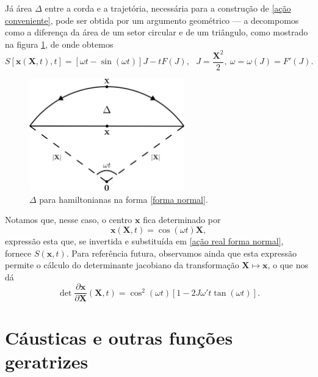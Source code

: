 \documentclass[
	12pt,
	oneside,			%
	a4paper,			%
	english,			%
	brazil				%
	]{abntex2}
\theoremstyle{definition}
\begin{document}
Já área $\Delta$ entre a corda e a trajetória, necessária para a construção de \eqref{ação conveniente}, pode ser obtida por um argumento geométrico — a decompomos como a diferença da área de um setor circular e de um triângulo, como mostrado na figura \ref{area birkhoff}, de onde obtemos
\begin{equation}
\label{ação real forma normal}
    S\left[ \mathbf{x}\left( \mathbf{X},t\right),t \right] = \left[ \omega t - \sin \left(\omega t\right) \right] J - t F\left( J \right), \ \ \ J = \frac{\mathbf{X}^2}{2}, \ \omega = \omega(J) = F'(J).
\end{equation}

\begin{figure}[H]
    \includegraphics[width=0.6\textwidth]{Imagens/area_birkhoff.png}
    \centering
    \caption{$\Delta$ para hamiltonianas na forma \eqref{forma normal}.}
    \label{area birkhoff}
\end{figure}

Notamos que, nesse caso, o centro $\mathbf{x}$ fica determinado por
\begin{equation}
\label{centro real forma normal}
    \mathbf{x}\left( \mathbf{X},t \right) = \cos \left( \omega t \right) \mathbf{X},
\end{equation}
expressão esta que, se invertida e substituída em \eqref{ação real forma normal}, fornece $S(\mathbf{x},t)$. Para referência futura, observamos ainda que esta expressão permite o cálculo do determinante jacobiano da transformação $\mathbf{X} \mapsto \mathbf{x}$, o que nos dá
\begin{equation}
\label{det jac real forma normal}
    \det \frac{\partial \mathbf{x}}{\partial \mathbf{X}}(\mathbf{X},t) = \cos^2 \left( \omega t \right)\left[1 - 2 J \omega'  t \tan \left( \omega t \right) \right] .
\end{equation}

\section{Cáusticas e outras funções geratrizes}
\label{Cáusticas e outras funções geratrizes}
\end{document}
